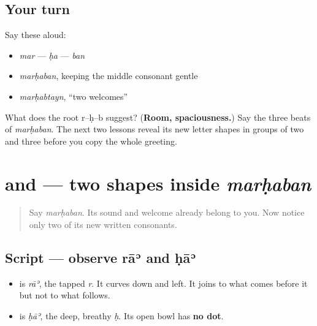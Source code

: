 \subsection*{Your turn}
Say these aloud:

\begin{itemize}
\raggedright
  \item \emph{mar} — \emph{ḥa} — \emph{ban}
  \item \emph{marḥaban}, keeping the middle consonant gentle
  \item \emph{marḥabtayn}, “two welcomes”
\end{itemize}

\begin{tcolorbox}[breakable,colback=teal!4,colframe=teal!35!black,title={Before you move on}]
What does the root r–ḥ–b suggest? (\textbf{Room, spaciousness.}) Say the three beats of \emph{marḥaban}. The next two lessons reveal its new letter shapes in groups of two and three before you copy the whole greeting.
\end{tcolorbox}
\section[\texorpdfstring{\ar{ر} \ar{ح} (rāʾ, ḥāʾ)}{ر ح (rāʾ, ḥāʾ)}]{ and  — two shapes inside \emph{marḥaban}}

\label{lesson:AR-W00-ra-ha}



\begin{quote}
Say \emph{marḥaban}. Its sound and welcome already belong to you. Now notice only two of its new written consonants.
\end{quote}

\subsection*{Script — observe rāʾ and ḥāʾ}

\begin{itemize}
\raggedright
  \item \textbf{} is \emph{rāʾ}, the tapped \emph{r}. It curves down and left. It joins to what comes before it but not to what follows.
  \item \textbf{} is \emph{ḥāʾ}, the deep, breathy \emph{ḥ}. Its open bowl has \textbf{no dot}.
\end{itemize}

